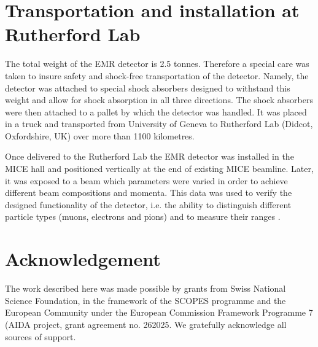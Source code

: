 \documentclass[a4paper,11pt]{article}
\begin{document}
\section{Transportation and installation at Rutherford Lab}

The total weight of the EMR detector is 2.5 tonnes. Therefore a special care was taken to insure safety and shock-free transportation of the detector.
Namely, the detector was attached to special shock absorbers designed to withstand this weight and allow for shock absorption in all three directions. The
shock absorbers were then attached to a pallet by which the detector was handled. It was placed in a truck and transported from University of Geneva to
Rutherford Lab (Didcot, Oxfordshire, UK) over more than 1100 kilometres. 

Once delivered to the Rutherford Lab the EMR detector was installed in the MICE hall and positioned vertically at the end of existing MICE beamline. Later,
it was exposed to a beam which parameters were varied in order to achieve different beam compositions and momenta. This data was used to verify the designed
functionality of the detector, i.e. the ability to distinguish different particle types (muons, electrons and pions) and to measure their ranges
\cite{performance}. 

\section*{Acknowledgement}
The work described here was made possible by grants from Swiss National Science Foundation, in the framework of the SCOPES programme and the European Community
under the European Commission Framework Programme 7 (AIDA project, grant agreement no. 262025. We gratefully acknowledge all sources of support.




\end{document}
